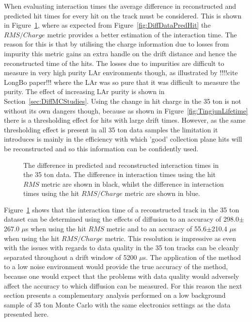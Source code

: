 When evaluating interaction times the average difference in reconstructed and predicted hit times for every hit on the track must be considered. This is shown in Figure~\ref{fig:DiffDataAvDiff}, where as expected from Figure~\ref{fig:DiffDataPredHit} the $RMS/Charge$ metric provides a better estimation of the interaction time. The reason for this is that by utilising the charge information due to losses from impurity this metric gains an extra handle on the drift distance and hence the reconstructed time of the hits. The losses due to impurities are difficult to measure in very high purity LAr environments though, as illustrated by !!!!cite LongBo paper!!! where the LAr was so pure that it was difficult to measure the purity. The effect of increasing LAr purity is shown in Section~\ref{sec:DiffMCStudies}. Using the change in hit charge in the 35 ton is not without its own dangers though, because as shown in Figure~\ref{fig:TingjunLifetime} there is a thresholding effect for hits with large drift times. However, as the same thresholding effect is present in all 35 ton data samples the limitation it introduces is mainly in the efficiency with which 'good' collection plane hits will be reconstructed and so this information can be confidently used. \\

\begin{figure}[h!]
  \centering
  \caption[The difference in predicted and reconstructed interaction times in the 35 ton data]
          {The difference in predicted and reconstructed interaction times in the 35 ton data. The difference in interaction times using the hit $RMS$ metric are shown in black, whilst the difference in interaction times using the hit $RMS/Charge$ metric are shown in blue.}
          \label{fig:DiffDataAvDiff}
\end{figure}

Figure~\ref{fig:DiffDataAvDiff} shows that the interaction time of a reconstructed track in the 35 ton dataset can be determined using the effects of diffusion to an accuracy of 298.0$\pm$267.0 $\mu$s when using the hit $RMS$ metric and to an accuracy of 55.6$\pm$210.4 $\mu$s when using the hit $RMS/Charge$ metric. This resolution is impressive as even with the issues with regards to data quality in the 35 ton tracks can be cleanly separated throughout a drift window of 5200 $\mu$s. The application of the method to a low noise environment would provide the true accuracy of the method, because one would expect that the problems with data quality would adversely affect the accuracy to which diffusion can be measured. For this reason the next section presents a complementary analysis performed on a low background sample of 35 ton Monte Carlo with the same electronics settings as the data presented here. 

